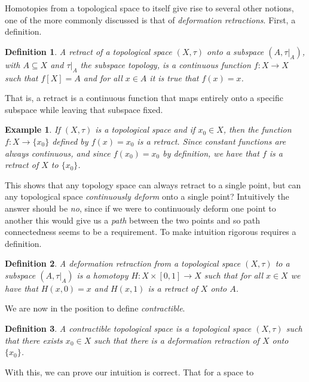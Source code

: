 \documentclass{article}
\theoremstyle{plain}
\theoremstyle{normal}
\newtheorem{definition}{Definition}[section]
\newtheorem{example}{Example}[section]
\begin{document}
        Homotopies from a topological space to itself give rise to several
        other notions, one of the more commonly discussed is that of
        \textit{deformation retractions}. First, a definition.
        \begin{definition}
            A retract of a topological space $(X,\tau)$ onto a subspace
            $(A,\tau|_{A})$, with $A\subseteq{X}$ and $\tau|_{A}$ the subspace
            topology, is a continuous function $f:X\rightarrow{X}$ such that
            $f[X]=A$ and for all $x\in{A}$ it is true that $f(x)=x$.
        \end{definition}
        That is, a retract is a continuous function that maps entirely onto
        a specific subspace while leaving that subspace fixed.
        \begin{example}
            If $(X,\tau)$ is a topological space and if $x_{0}\in{X}$, then
            the function $f:X\rightarrow\{x_{0}\}$ defined by
            $f(x)=x_{0}$ is a retract. Since constant functions are always
            continuous, and since $f(x_{0})=x_{0}$ by definition, we have that
            $f$ is a retract of $X$ to $\{x_{0}\}$.
        \end{example}
        This shows that any topology space can always retract to a single
        point, but can any topological space \textit{continuously deform}
        onto a single point? Intuitively the answer should be \textit{no},
        since if we were to continuously deform one point to another this would
        give us a \textit{path} between the two points and so
        path connectedness seems to be a requirement. To make intuition
        rigorous requires a definition.
        \begin{definition}
            A deformation retraction from a topological space $(X,\tau)$ to a
            subspace $(A,\tau|_{A})$ is a homotopy
            $H:X\times[0,1]\rightarrow{X}$ such that for all $x\in{X}$ we
            have that $H(x,0)=x$ and $H(x,1)$ is a retract of $X$ onto $A$.
        \end{definition}
        We are now in the position to define \textit{contractible}.
        \begin{definition}
            A contractible topological space is a topological space $(X,\tau)$
            such that there exists $x_{0}\in{X}$ such that there is a
            deformation retraction of $X$ onto $\{x_{0}\}$.
        \end{definition}
        With this, we can prove our intuition is correct. That for a space to
\end{document}
